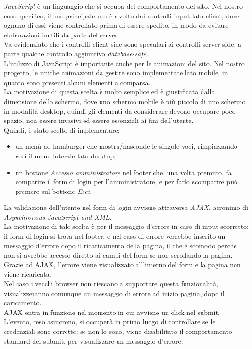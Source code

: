 ﻿\emph{JavaScript} è un linguaggio che si occupa del comportamento del sito. Nel nostro caso specifico, il suo principale uso è rivolto dai controlli 
input lato client, dove ognuno di essi viene controllato prima di essere spedito, in modo da evitare elaborazioni inutili da parte del server.\\
Va evidenziato che i controlli client-side sono speculari ai controlli server-side, a parte qualche controllo aggiuntivo \emph{database-safe}.\\
L'utilizzo di JavaScript è importante anche per le animazioni del sito. Nel nostro progetto, le uniche animazioni da gestire sono implementate 
lato mobile, in quanto sono presenti alcuni elementi a comparsa.\\
La motivazione di questa scelta è molto semplice ed è giustificata dalla dimensione dello schermo, dove uno schermo mobile è più piccolo di uno schermo
in modalità desktop, quindi gli elementi da considerare devono occupare poco spazio, non essere invasivi ed essere essenziali ai fini dell'utente. \\
Quindi, è stato scelto di implementare:
\begin{itemize}
    \item un menù ad hamburger che mostra/nasconde le singole voci, rimpiazzando così il menu laterale lato desktop;
    \item un bottone \emph{Accesso amministratore} nel footer che, una volta premuto, fa comparire il form di login per l'amministratore, e per farlo
    scomparire può premere sul bottone \emph{Esci.} 
\end{itemize}    

La validazione dell'utente nel form di login avviene attraverso \emph{AJAX}, acronimo di \emph{Asynchronous JavaScript and XML}.\\ 
La motivazione di tale scelta è per il messaggio d'errore in caso di input scorretto: il form di login si trova nel footer, e nel caso di errore 
verrebbe inserito un messaggio d'errore dopo il ricaricamento della pagina, il che è scomodo perchè non si avrebbe accesso diretto ai campi del form
se non scrollando la pagina.\\
Grazie ad AJAX, l'errore viene visualizzato all'interno del form e la pagina non viene ricaricata.\\
Nel caso i vecchi browser non riescano a supportare questa funzionalità, visualizzeranno comunque un messaggio di errore ad inizio pagina, 
dopo il caricamento.\\
AJAX entra in funzione nel momento in cui avviene un click nel submit. L'evento, reso asincrono, si occuperà in primo luogo di controllare 
se le credenziali sono corrette: se non lo sono, viene disabilitato il comportamento standard del submit, per visualizzare 
un messaggio d'errore.\\